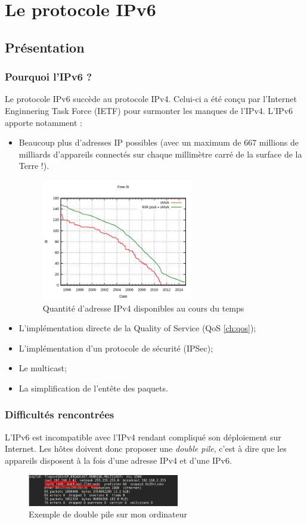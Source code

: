 \chapter{Le protocole IPv6}\label{ch:ipv6}

\section{Présentation}
\subsection{Pourquoi l'IPv6 ?}
Le protocole IPv6 succède au protocole IPv4. Celui-ci a été conçu par l'Internet Enginnering Task Force (IETF) pour surmonter les manques de l'IPv4. L'IPv6 apporte notamment :
\begin{itemize}
\item Beaucoup plus d'adresses IP possibles  (avec un maximum de 667 millions de milliards d'appareils connectés sur chaque millimètre carré de la surface de la Terre !). 
    
    \begin{figure}[h]
    \includegraphics[width=250px]{figures/ipv4-exhaust.png}
    \centering
    \caption{Quantité d'adresse IPv4 disponibles au cours du temps}
    \end{figure}

\item L'implémentation directe de la Quality of Service (QoS \ref{ch:qos});
\item L'implémentation d'un protocole de sécurité (IPSec);
\item Le multicast;
\item La simplification de l'entête des paquets.
\end{itemize}


\subsection{Difficultés rencontrées}
L'IPv6 est incompatible avec l'IPv4 rendant compliqué son déploiement sur Internet. Les hôtes doivent donc proposer une \textit{double pile}, c'est à dire que les appareils disposent à la fois d'une adresse IPv4 et d'une IPv6.
    \begin{figure}[h]
    \includegraphics[width=250px]{figures/doubleStack.png}
    \centering
    \caption{Exemple de double pile sur mon ordinateur}
    \end{figure}
    
